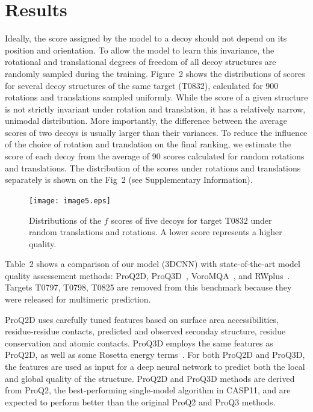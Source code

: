 \documentclass{bioinfo}
\begin{document}
\section{Results}
Ideally, the score assigned by the model to a decoy should not depend
on its position and orientation.  To allow the model to learn this
invariance, the rotational and translational degrees of freedom of all
decoy structures are randomly sampled during the training.
Figure~2\vphantom{\ref{Fig:DecoysScoreDistribution}} shows the distributions of
scores for several decoy structures of the same target (T0832),
calculated for 900 rotations and translations sampled uniformly.
While the score of a given structure is not strictly invariant under
rotation and translation, it has a relatively narrow, unimodal
distribution.  More importantly, the difference between the average
scores of two decoys is usually larger than their variances. To reduce
the influence of the choice of rotation and translation on the final
ranking, we estimate the score of each decoy from the average of 90
scores calculated for random rotations and translations. The distribution 
of the scores under rotations and translations separately is shown on 
the Fig~2\vphantom{S4} (see Supplementary Information).

\begin{figure}[!tpb]
    \centering
    \texttt{[image: image5.eps]}
    \caption{Distributions of the $f$ scores of five decoys for target
    T0832 under random translations and rotations. A lower score
    represents a higher quality.}
    \label{Fig:DecoysScoreDistribution}
\end{figure}

Table~2\vphantom{\ref{Tbl:TestResults}} shows a comparison of our model (3DCNN)
with state-of-the-art model quality assessement methods: ProQ2D,
ProQ3D~\citep{uziela2017proq3d}, VoroMQA~\citep{olechnovivc2017voromqa},
and RWplus~\citep{zhang2010novel}.
Targets T0797, T0798, T0825 are removed from this benchmark because
they were released for multimeric prediction.

ProQ2D uses carefully tuned features based on surface area
accessibilities, residue-residue contacts, predicted and observed
seconday structure, residue conservation and atomic contacts. ProQ3D
employs the same features as ProQ2D, as well as some Rosetta energy
terms~\citep{leaverfay2011rosetta}. For both ProQ2D and ProQ3D, the
features are used as input for a deep neural network to predict both
the local and global quality of the structure.
ProQ2D and ProQ3D methods are derived from ProQ2, the best-performing
single-model algorithm in CASP11, and are expected to perform better
than the original ProQ2 and ProQ3 methods.
\end{document}
